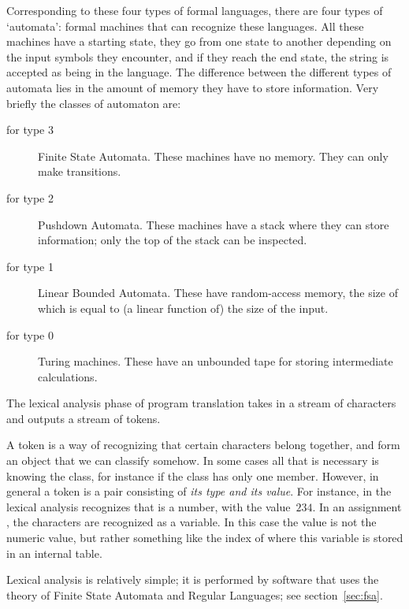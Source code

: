 Corresponding to these four types of formal languages, there are four
types of `automata': formal machines that can
recognize these languages. All these machines have a starting state,
they go from one state to another depending on the input symbols they
encounter, and if they reach the end state, the string is accepted as
being in the language. The difference between the different types of
automata lies in the amount of memory they have to store information.
Very briefly the classes of automaton are:
\begin{description}
\item[for type 3] Finite State Automata. These machines have no
  memory. They can only make transitions.
\item[for type 2] Pushdown Automata. These
  machines have a stack where they can store information; only the top
  of the stack can be inspected.
\item[for type 1] Linear Bounded
  Automata. These have random-access memory, the size of which is
  equal to (a linear function of) the size of the input.
\item[for type 0] Turing machines. These have an
  unbounded tape for storing intermediate calculations.
\end{description}


The lexical analysis phase of program translation takes in a stream of
characters and outputs a stream of tokens. 

A token is a way of recognizing that certain characters belong
together, and form an object that we can classify somehow. In some
cases all that is necessary is knowing the class, for instance if the
class has only one member. However, in general a token is a pair
consisting of {\em its type and its value}. For instance, in 
the lexical analysis recognizes that  is a number, with the
value~$234$. In an assignment , the characters 
are recognized as a variable. In this case the value is not the
numeric value, but rather something like the index of where this
variable is stored in an internal table.

Lexical analysis is relatively simple; it is performed by software
that uses the theory of Finite State Automata and Regular Languages;
see section~\ref{sec:fsa}.

